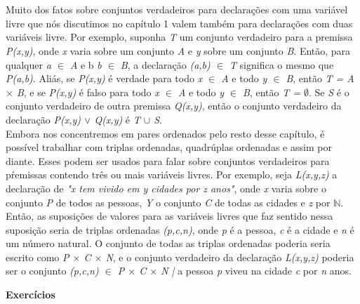   \\
  \\
\indent  Muito dos fatos sobre conjuntos verdadeiros para declarações com uma variável livre que nós discutimos no capítulo 1 valem também para declarações com duas variáveis livre. Por exemplo, suponha \textit{T} um conjunto verdadeiro para a premissa \textit{P(x,y)}, onde \textit{x} varia sobre um conjunto \textit{A} e \textit{y} sobre um conjunto \textit{B}. Então, para qualquer \textit{a $\in$ A} e b \textit{b $\in$ B}, a declaração \textit{(a,b) $\in$ T} significa o mesmo que \textit{P(a,b)}. Aliás, se \textit{P(x,y)} é verdade para todo \textit{x $\in$ A} e todo \textit{y $\in$ B}, então \textit{T = A $\times$ B}, e se \textit{P(x,y)} é falso para todo \textit{x $\in$ A} e todo \textit{y $\in$ B}, então \textit{T = $\emptyset$}. Se \textit{S} é o conjunto verdadeiro de outra premissa \textit{Q(x,y)}, então o conjunto verdadeiro da declaração \textit{P(x,y) $\vee$ Q(x,y)} é \textit{T $\cup$ S}.
  \\
 \indent Embora nos concentremos em pares ordenados pelo resto desse capítulo, é possível trabalhar com triplas ordenadas, quadrúplas ordenadas e assim por diante. Esses podem ser usados para falar sobre conjuntos verdadeiros para pŕemissas contendo três ou mais variáveis livres. Por exemplo, seja \textit{L(x,y,z)} a declaração de \textit{"x tem vivido em y cidades por z anos"}, onde \textit{x} varia sobre o conjunto \textit{P} de todos as pessoas, \textit{Y} o conjunto \textit{C} de todas as cidades e \textit{z} por $\mathbb{N}$. Então, as suposições de valores para as variáveis livres que faz sentido nessa suposição seria de triplas ordenadas \textit{(p,c,n)}, onde \textit{p} é a pessoa, \textit{c} é a cidade e \textit{n} é um número natural. O conjunto de todas as triplas ordenadas poderia seria escrito como \textit{P $\times$ C $\times$ N}, e o conjunto verdadeiro da declaração \textit{L(x,y,z)} poderia ser o conjunto {\textit{(p,c,n) $\in$ P $\times$ C $\times$ N |} a pessoa \textit{p} viveu na cidade \textit{c} por \textit{n} anos}.
   \\
  \begin{center}
   \textbf{Exercícios}
  \end{center}
  
